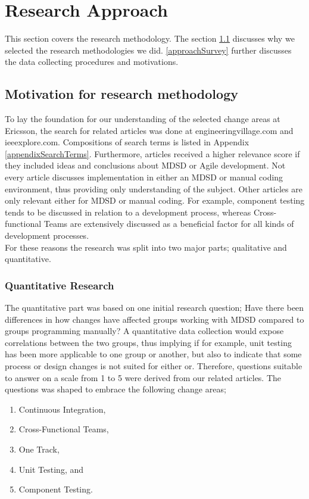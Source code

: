 \documentclass[final_report_innit.tex]{subfiles}
\begin{document}
\section{Research Approach}\label{approach}
This section covers the research methodology. The section \ref{approachChoice} discusses why we selected the research methodologies we did. \ref{approachSurvey} further discusses the data collecting procedures and motivations.

\subsection{Motivation for research methodology}\label{approachChoice}
To lay the foundation for our understanding of the selected change areas at Ericsson, the search for related articles was done at engineeringvillage.com and ieeexplore.com. Compositions of search terms is listed in Appendix \ref{appendixSearchTerms}. Furthermore, articles received a higher relevance score if they included ideas and conclusions about MDSD or Agile development. Not every article discusses implementation in either an MDSD or manual coding environment, thus providing only understanding of the subject. Other articles are only relevant either for MDSD or manual coding. For example, component testing tends to be discussed in relation to a development process, whereas Cross-functional Teams are extensively discussed as a beneficial factor for all kinds of development processes.
\\

For these reasons the research was split into two major parts; qualitative and quantitative.
\\
\subsubsection{Quantitative Research}\label{approachQuant}
The quantitative part was based on one initial research question; Have there been differences in how changes have affected groups working with MDSD compared to groups programming manually? A quantitative data collection would expose correlations between the two groups, thus implying if for example, unit testing has been more applicable to one group or another, but also to indicate that some process or design changes is not suited for either or. Therefore, questions suitable to answer on a scale from 1 to 5 were derived from our related articles. The questions was shaped to embrace the following change areas;
\\
\begin{enumerate}
	\item Continuous Integration,
	\item Cross-Functional Teams,
	\item One Track,
	\item Unit Testing, and
	\item Component Testing. \\ %
\end{enumerate}
\end{document}
